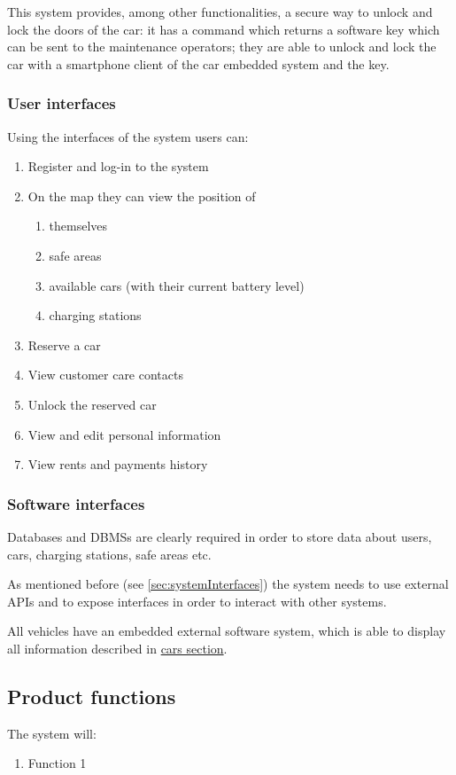 	This system provides, among other functionalities, a secure way to unlock and lock the doors of the car: it has a command which returns a software key which can be sent to the maintenance operators; they are able to unlock and lock the car with a smartphone client  of the car embedded system and the key.
	
		
\subsubsection{User interfaces}
	Using the interfaces of the system users can:
	\begin{enumerate}
		\item Register and log-in to the system
		\item On the map they can view the position of
			\begin{enumerate}[label=\alph*)]
				\item themselves
				\item safe areas
				\item available cars (with their current battery level)
				\item charging stations
			\end{enumerate}
		\item Reserve a car
		\item View customer care contacts 
		\item Unlock the reserved car
		\item View and edit personal information
		\item View rents and payments history
	\end{enumerate}

\subsubsection{Software interfaces}
Databases and DBMSs are clearly required in order to store data about users, cars, charging stations, safe areas etc.

As mentioned before (see \autoref{sec:systemInterfaces}) the system needs to use external APIs and to expose interfaces in order to interact with other systems.

All vehicles have an embedded external software system, which is able to display all information described in \hyperref[sec:cars]{cars section}. 

\subsection{Product functions}
	The system will:
	\begin{enumerate}[label=\textbf{F\arabic*.}]
		\item Function 1
	\end{enumerate}

